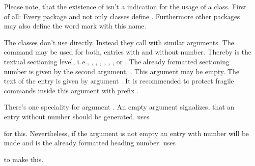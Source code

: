 Please note, that the existence of
 isn't a indication for the usage of a
\KOMAScript{} class. First of all: Every \KOMAScript{} package and not only
\KOMAScript{} classes define . Furthermore other packages
may also define the \KOMAScript{} word mark with this name.%
% 
%
%

\begin{Declaration}
\end{Declaration}
%
The \KOMAScript{} classes don't use
%
 directly. Instead they
call  with similar arguments. The command may be used
for both, entries with and without number. Thereby  is the
textual sectioning level, i.\,e.,  ,
, , ,
, , or . The
already formatted sectioning number is given by the second argument,
. This argument may be empty. The text of the entry is given by
argument . It is recommended to protect fragile commands inside
this argument with prefix
.

There's one speciality for argument . An empty argument
signalizes, that an entry without number should be generated. \KOMAScript{}
uses
\begin{quote}
\end{quote}
for this. Nevertheless, if the argument is not empty an entry with number
will be made and  is the already formatted heading
number. \KOMAScript{} uses
\begin{quote}\raggedright
\end{quote}
to make this.

